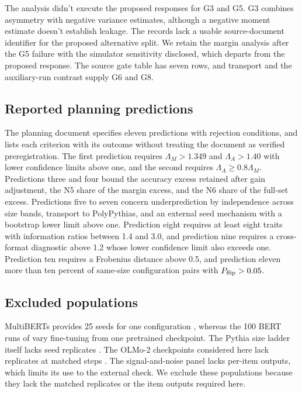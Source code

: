 The analysis didn't execute the proposed responses for G3 and G5. G3 combines asymmetry with negative variance estimates, although a negative moment estimate doesn't establish leakage. The records lack a usable source-document identifier for the proposed alternative split. We retain the margin analysis after the G5 failure with the simulator sensitivity disclosed, which departs from the proposed response. The source gate table has seven rows, and transport and the auxiliary-run contrast supply G6 and G8.
\subsection{Reported planning predictions}
The planning document specifies eleven predictions with rejection conditions, and  lists each criterion with its outcome without treating the document as verified preregistration. The first prediction requires $\Lambda_M>1.349$ and $\Lambda_A>1.40$ with lower confidence limits above one, and the second requires $\Lambda_A\geq0.8\Lambda_M$. Predictions three and four bound the accuracy excess retained after gain adjustment, the N5 share of the margin excess, and the N6 share of the full-set excess. Predictions five to seven concern underprediction by independence across size bands, transport to PolyPythias, and an external seed mechanism with a bootstrap lower limit above one. Prediction eight requires at least eight traits with information ratios between 1.4 and 3.0, and prediction nine requires a cross-format diagnostic above 1.2 whose lower confidence limit also exceeds one. Prediction ten requires a Frobenius distance above 0.5, and prediction eleven more than ten percent of same-size configuration pairs with $P_{\rm flip}>0.05$.
\subsection{Excluded populations}
MultiBERTs provides 25 seeds for one configuration \citep{sellam2022}, whereas the 100 BERT runs of \citet{mccoy2020} vary fine-tuning from one pretrained checkpoint. The Pythia size ladder itself lacks seed replicates \citep{biderman2023}. The OLMo-2 checkpoints considered here lack replicates at matched steps \citep{teamolmo2025}. The signal-and-noise panel lacks per-item outputs, which limits its use to the external check. We exclude these populations because they lack the matched replicates or the item outputs required here.

